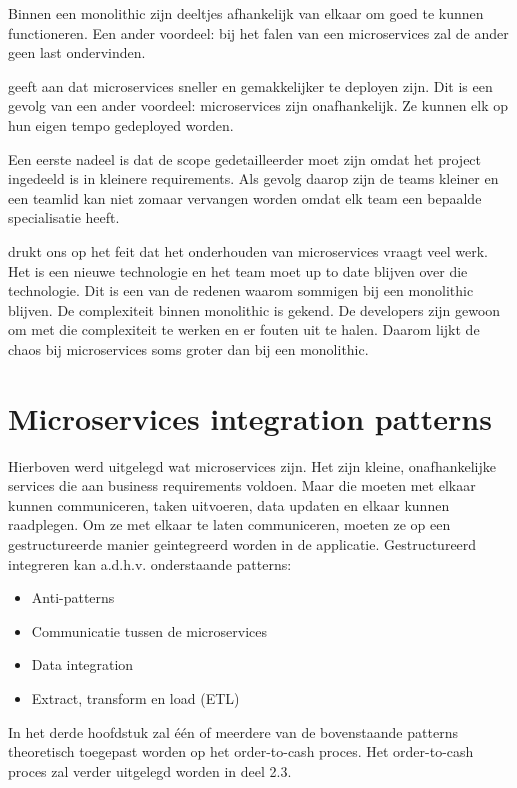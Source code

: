 Binnen een monolithic zijn deeltjes afhankelijk van elkaar om goed te kunnen functioneren. Een ander voordeel: bij het falen van een microservices zal de ander geen last ondervinden. 

\textcite{Benetis2016} geeft aan dat microservices sneller en gemakkelijker te deployen zijn. Dit is een gevolg van een ander voordeel: microservices zijn onafhankelijk. Ze kunnen elk op hun eigen tempo gedeployed worden.

Een eerste nadeel is dat de scope gedetailleerder moet zijn omdat het project ingedeeld is in kleinere requirements. Als gevolg daarop zijn de teams kleiner en een teamlid kan niet zomaar vervangen worden omdat elk team een bepaalde specialisatie heeft.

\textcite{Koukia2018} drukt ons op het feit dat het onderhouden van microservices vraagt veel werk. Het is een nieuwe technologie en het team moet up to date blijven over die technologie. Dit is een van de redenen waarom sommigen bij een monolithic blijven. De complexiteit binnen monolithic is gekend. De developers zijn gewoon om met die complexiteit te werken en er fouten uit te halen. Daarom lijkt de chaos bij microservices soms groter dan bij een monolithic.

\section{Microservices integration patterns}
Hierboven werd uitgelegd wat microservices zijn. Het zijn kleine, onafhankelijke services die aan business requirements voldoen. Maar die moeten met elkaar kunnen communiceren, taken uitvoeren, data updaten en elkaar kunnen raadplegen. Om ze met elkaar te laten communiceren, moeten ze op een gestructureerde manier geintegreerd worden in de applicatie. Gestructureerd integreren kan a.d.h.v. onderstaande patterns:
\begin{itemize}
	\item Anti-patterns
	\item Communicatie tussen de microservices
	\item Data integration
	\item Extract, transform en load (ETL)	
\end{itemize}

In het derde hoofdstuk zal één of meerdere van de bovenstaande patterns theoretisch toegepast worden op het order-to-cash proces. Het order-to-cash proces zal verder uitgelegd worden in deel 2.3.
